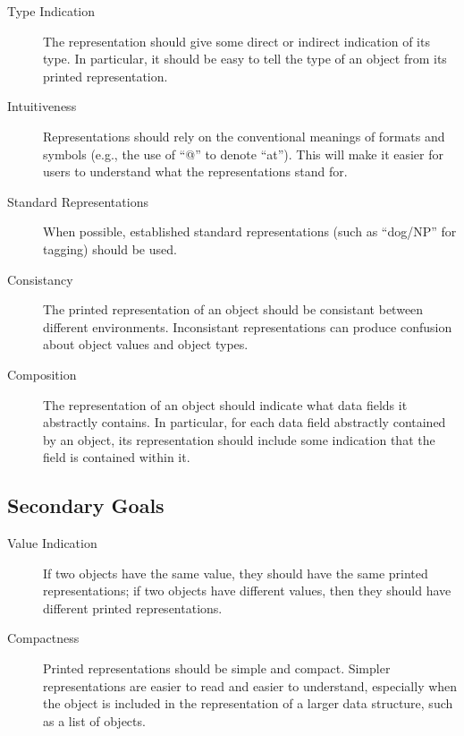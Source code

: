 \documentclass[11pt]{article}
\begin{document}
  \begin{description}

    \item[Type Indication] The representation should give some direct
    or indirect indication of its type.  In particular, it should be
    easy to tell the type of an object from its printed
    representation.

    \item[Intuitiveness] Representations should rely on the
    conventional meanings of formats and symbols (e.g., the use of
    ``@'' to denote ``at'').  This will make it easier for users to
    understand what the representations stand for.

    \item[Standard Representations] When possible, established
    standard representations (such as ``dog/NP'' for tagging) should
    be used.

    \item[Consistancy] The printed representation of an object should
    be consistant between different environments.  Inconsistant
    representations can produce confusion about object values and
    object types.

    \item[Composition] The representation of an object should indicate
    what data fields it abstractly contains.  In particular, for each
    data field abstractly contained by an object, its representation
    should include some indication that the field is contained within
    it.

  \end{description}

  \subsection{Secondary Goals}

  \begin{description}

    \item[Value Indication] If two objects have the same value, they
    should have the same printed representations; if two objects have
    different values, then they should have different printed
    representations.

    \item[Compactness] Printed representations should be simple and
    compact.  Simpler representations are easier to read and easier to
    understand, especially when the object is included in the
    representation of a larger data structure, such as a list of
    objects.

  \end{description}
\end{document}
